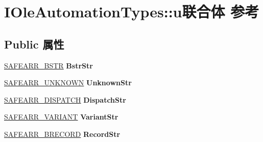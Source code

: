 \hypertarget{union_i_ole_automation_types_1_1u}{}\section{I\+Ole\+Automation\+Types\+:\+:u联合体 参考}
\label{union_i_ole_automation_types_1_1u}
\subsection*{Public 属性}
\begin{DoxyCompactItemize}
\item 
\mbox{\label{union_i_ole_automation_types_1_1u_a61dd6e5479feb643a3bae4405565e612}} 
\hyperlink{struct_i_ole_automation_types_1_1__wire_s_a_f_e_a_r_r___b_s_t_r}{S\+A\+F\+E\+A\+R\+R\+\_\+\+B\+S\+TR} {\bfseries Bstr\+Str}
\item 
\mbox{\label{union_i_ole_automation_types_1_1u_a7acfca5bf2353fbb327a82d6cb1f82a7}} 
\hyperlink{struct_i_ole_automation_types_1_1__wire_s_a_f_e_a_r_r___u_n_k_n_o_w_n}{S\+A\+F\+E\+A\+R\+R\+\_\+\+U\+N\+K\+N\+O\+WN} {\bfseries Unknown\+Str}
\item 
\mbox{\label{union_i_ole_automation_types_1_1u_afee24d2e63360cf6a6deb4ed8a72608e}} 
\hyperlink{struct_i_ole_automation_types_1_1__wire_s_a_f_e_a_r_r___d_i_s_p_a_t_c_h}{S\+A\+F\+E\+A\+R\+R\+\_\+\+D\+I\+S\+P\+A\+T\+CH} {\bfseries Dispatch\+Str}
\item 
\mbox{\label{union_i_ole_automation_types_1_1u_aba1633b2ad67313348110152e786f579}} 
\hyperlink{struct_i_ole_automation_types_1_1__wire_s_a_f_e_a_r_r___v_a_r_i_a_n_t}{S\+A\+F\+E\+A\+R\+R\+\_\+\+V\+A\+R\+I\+A\+NT} {\bfseries Variant\+Str}
\item 
\mbox{\label{union_i_ole_automation_types_1_1u_a38091dea4bf21545c8f44fdcaeb3b8d3}} 
\hyperlink{struct_i_ole_automation_types_1_1__wire_s_a_f_e_a_r_r___b_r_e_c_o_r_d}{S\+A\+F\+E\+A\+R\+R\+\_\+\+B\+R\+E\+C\+O\+RD} {\bfseries Record\+Str}
\item 
\mbox{\label{union_i_ole_automation_types_1_1u_acc6f57cd65711be28f1d1a53dc58f8c8}} 

\end{DoxyCompactItemize}

